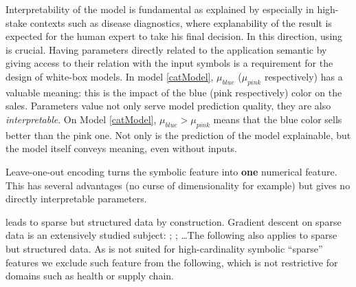 Interpretability of the model is fundamental as explained by \cite{Stop} especially in high-stake contexts such as disease diagnostics, where explanability of the result is expected for the human expert to take his final decision.
In this direction, using \ohe  is crucial. Having parameters directly related to the application semantic by giving access to their relation with the input symbols is a requirement for the design of white-box models. In model \ref{catModel}, $\mu_{blue}$ ($\mu_{pink}$ respectively) has a valuable meaning: this is the impact of the blue (pink respectively) color on the sales. Parameters value not only serve model prediction quality, they are also \textit{interpretable}.  On Model \ref{catModel}, $\mu_{blue} >\mu_{pink}$ means that the blue color sells better than the pink one. Not only is the prediction of the model explainable, but the model itself conveys meaning, even without inputs.

Leave-one-out encoding turns the symbolic feature into \textbf{one} numerical feature. This has several advantages (no curse of dimensionality for example) but gives no directly interpretable parameters.

\ohe leads to sparse but structured data by construction. Gradient descent on sparse data is an extensively studied subject: \cite{GDsparseData} \cite{FastLearningSparse}; \cite{LinearLearningSparseData}; \cite{SparseOnlineLearning} \dots The following also applies to sparse but structured data. As \ohe is not suited for high-cardinality symbolic “sparse” features we exclude such feature from the following, which is not restrictive for domains such as health or supply chain.
